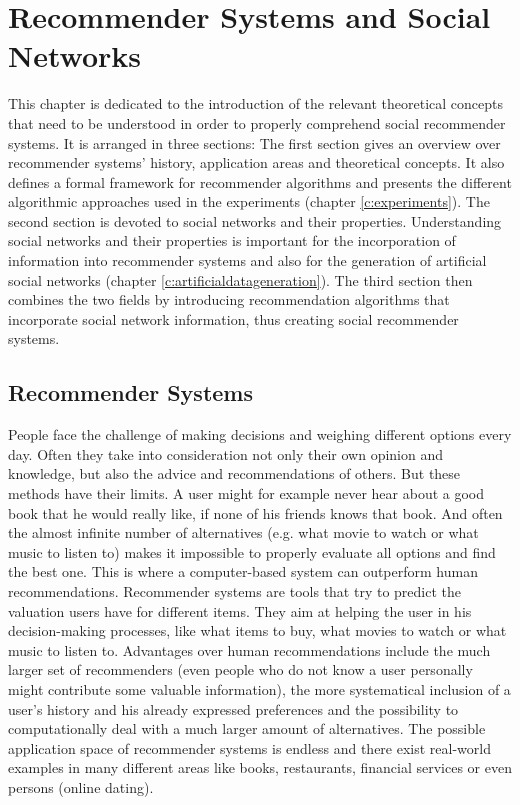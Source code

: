 \chapter{Recommender Systems and Social Networks}
\label{c:recommendersystemsandsocialnetworks} This chapter is dedicated to the introduction of the relevant theoretical concepts that need to be understood in order to properly comprehend social recommender systems. It is arranged in three sections: The first section gives an overview over recommender systems' history, application areas and theoretical concepts. It also defines a formal framework for recommender algorithms and presents the different algorithmic approaches used in the experiments (chapter \ref{c:experiments}). The second section is devoted to social networks and their properties. Understanding social networks and their properties is important for the incorporation of information into recommender systems and also for the generation of artificial social networks (chapter \ref{c:artificialdatageneration}). The third section then combines the two fields by introducing recommendation algorithms that incorporate social network information, thus creating social recommender systems.

\section{Recommender Systems}
\label{st:recommendersystems} People face the challenge of making decisions and weighing different options every day. Often they take into consideration not only their own opinion and knowledge, but also the advice and recommendations of others. But these methods have their limits. A user might for example never hear about a good book that he would really like, if none of his friends knows that book. And often the almost infinite number of alternatives (e.g. what movie to watch or what music to listen to) makes it impossible to properly evaluate all options and find the best one. This is where a computer-based system can outperform human recommendations. Recommender systems are tools that try to predict the valuation users have for different items. They aim at helping the user in his decision-making processes, like what items to buy, what movies to watch or what music to listen to. Advantages over human recommendations include the much larger set of recommenders (even people who do not know a user personally might contribute some valuable information), the more systematical inclusion of a user's history and his already expressed preferences and the possibility to computationally deal with a much larger amount of alternatives. The possible application space of recommender systems is endless and there exist real-world examples in many different areas like books, restaurants, financial services \cite{Felfernig_2007} or even persons (online dating).

